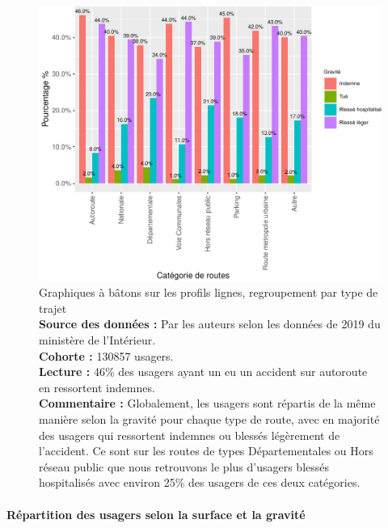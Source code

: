 \documentclass[french,]{tp}
\let\oldparagraph\paragraph
\renewcommand{\paragraph}[1]{\oldparagraph{#1}\mbox{}}
\begin{document}
\begin{figure}[ht!]

{\centering \includegraphics{Prediction_Gravite_files/figure-latex/barplotroute-1} 

}

\caption{Graphiques à bâtons sur les profils lignes, regroupement par type de trajet\\
\textbf{Source des données :} Par les auteurs selon les données de 2019 du ministère de l'Intérieur.\\
\textbf{Cohorte :} 130857 usagers.\\
\textbf{Lecture :} 46\% des usagers ayant un eu un accident sur autoroute en ressortent indemnes.\\
\textbf{Commentaire :} Globalement, les usagers sont répartis de la même manière selon la gravité pour chaque type de route, avec en majorité des usagers qui ressortent indemnes ou blessés légèrement de l'accident. Ce sont sur les routes de types Départementales ou Hors réseau public que nous retrouvons le plus d'usagers blessés hospitalisés avec environ 25\% des usagers de ces deux catégories.}\label{fig:barplotroute}
\end{figure}

\newpage

\hypertarget{ruxe9partition-des-usagers-selon-la-surface-et-la-gravituxe9}{%
\paragraph{Répartition des usagers selon la surface et la gravité}\label{ruxe9partition-des-usagers-selon-la-surface-et-la-gravituxe9}}
\end{document}
